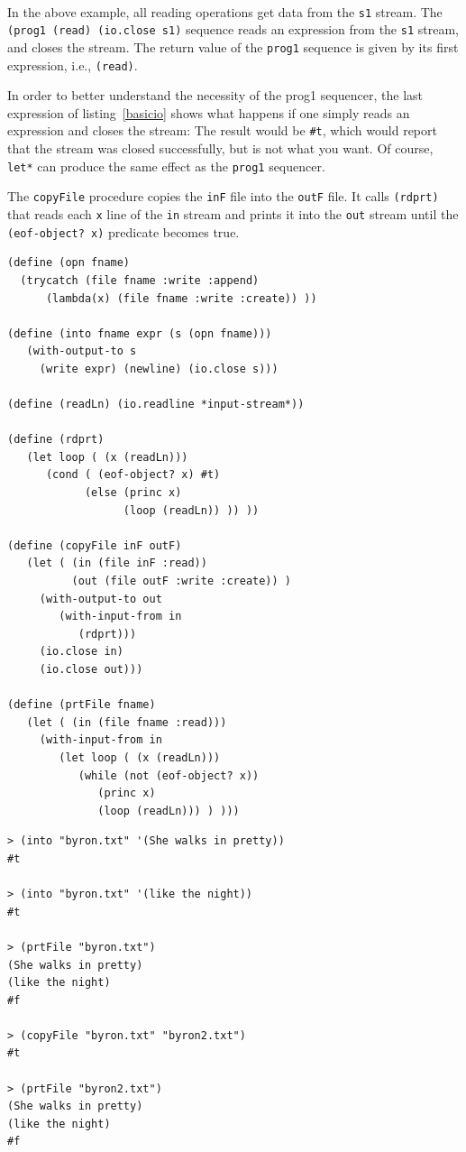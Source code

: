 \documentclass[a4paper,12pt]{book}
\begin{document}
\verb||\\
In the above example, all reading
operations get data from the \verb|s1| stream.
The {\small \verb|(prog1 (read) (io.close s1)|}
sequence reads an expression from the \verb|s1|
stream, and closes the stream. The return
value of the \verb|prog1| sequence is given by its
first expression, i.e., \verb|(read)|.

In order to better understand the
necessity of the prog1 sequencer,
the last expression of listing~\ref{basicio}
shows what happens if one simply reads
an expression and closes the stream:
The result would be \verb|#t|, which
would report that the stream was closed 
successfully, but is not what you want.
Of course, \verb|let*| can produce
the same effect as the \verb|prog1| sequencer.

The \verb|copyFile| procedure copies
the \verb|inF| file into the \verb|outF| file.
It calls \verb|(rdprt)| that reads
each \verb|x| line of the \verb|in| stream
and prints it into the \verb|out| stream
until the \verb|(eof-object? x)| predicate
becomes true.

\begin{verbatim}
(define (opn fname)
  (trycatch (file fname :write :append)
      (lambda(x) (file fname :write :create)) ))

(define (into fname expr (s (opn fname)))
   (with-output-to s
     (write expr) (newline) (io.close s)))

(define (readLn) (io.readline *input-stream*))

(define (rdprt)
   (let loop ( (x (readLn)))
      (cond ( (eof-object? x) #t)
            (else (princ x)
                  (loop (readLn)) )) ))

(define (copyFile inF outF)
   (let ( (in (file inF :read))
          (out (file outF :write :create)) )
     (with-output-to out
        (with-input-from in
           (rdprt)))
     (io.close in)
     (io.close out)))

(define (prtFile fname)
   (let ( (in (file fname :read)))
     (with-input-from in
        (let loop ( (x (readLn)))
           (while (not (eof-object? x))
              (princ x)
              (loop (readLn))) ) )))
\end{verbatim}

\begin{verbatim}
> (into "byron.txt" '(She walks in pretty))
#t

> (into "byron.txt" '(like the night))
#t

> (prtFile "byron.txt")
(She walks in pretty)
(like the night)
#f

> (copyFile "byron.txt" "byron2.txt")
#t

> (prtFile "byron2.txt")
(She walks in pretty)
(like the night)
#f
\end{verbatim}
\end{document}
